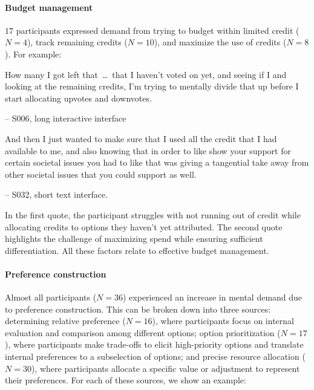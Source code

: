 \paragraph{Budget management} $17$ participants expressed demand from trying to budget within limited credit ($N=4$), track remaining credits ($N=10$), and maximize the use of credits ($N=8$). For example:

\begin{displayquote}
How many I got left that~\ldots\ that I haven't voted on yet, and seeing if I and looking at the remaining credits, I'm trying to mentally divide that up before I start allocating upvotes and downvotes.

\small{\noindent \hfill -- S006, long interactive interface}
\end{displayquote}

\begin{displayquote}
And then I just wanted to make sure that I used all the credit that I had available to me, and also knowing that in order to like show your support for certain societal issues you had to like that was giving a tangential take away from other societal issues that you could support as well.
    
\noindent \hfill -- S032, short text interface.
\end{displayquote}

In the first quote, the participant struggles with not running out of credit while allocating credits to options they haven't yet attributed. The second quote highlights the challenge of maximizing spend while ensuring sufficient differentiation. All these factors relate to effective budget management.

\paragraph{Preference construction} Almost all participants ($N=36$) experienced an increase in mental demand due to preference construction. This can be broken down into three sources: determining relative preference ($N=16$), where participants focus on internal evaluation and comparison among different options; option prioritization ($N=17$),  where participants make trade-offs to elicit high-priority options and translate internal preferences to a subselection of options; and precise resource allocation ($N=30$), where participants allocate a specific value or adjustment to represent their preferences. For each of these sources, we show an example:

